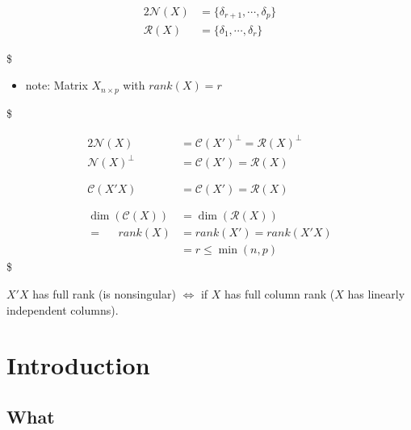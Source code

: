 \documentclass[
]{book}
\providecommand{\tightlist}{%
  \setlength{\itemsep}{0pt}\setlength{\parskip}{0pt}}
\begin{document}
{{{\begin{alignat}{2}
\mathcal{N}(X)

&= \{ \delta_{r+1} , \cdots, \delta_{p} \}

\\


\mathcal{R}(X)

&= \{ \delta_{1} , \cdots, \delta_{r} \}


\end{alignat}

\$

\begin{itemize}
\tightlist
\item
  note: Matrix \(X_{n \times p}\) with \(rank(X)=r\)
\end{itemize}

\$

\begin{alignat}{2}

\mathcal{N}(X) &= \mathcal{C}(X')^{\perp} = \mathcal{R}(X)^{\perp} \\

\mathcal{N}(X)^{\perp}

&= \mathcal{C}(X')
= \mathcal{R}(X) \\

\\

\\

\mathcal{C}(X'X) &= \mathcal{C}(X') = \mathcal{R}(X) \\

\\

\\

\dim \left( \mathcal{C}(X) \right) &= 
\dim \left( \mathcal{R}(X) \right) \\
= \; \; \; \; \; 
rank(X) &= 
rank(X') = 
rank(X'X) \\ &= r \le \min(n, p)

\end{alignat}
\$

\(X'X\) has full rank (is nonsingular) \(\iff\) if \(X\) has full column rank (\(X\) has linearly independent columns).

\hypertarget{introduction-1}{%
\section{Introduction}\label{introduction-1}}

\hypertarget{what}{%
\subsection{What}\label{what}}

}}}
\end{document}
